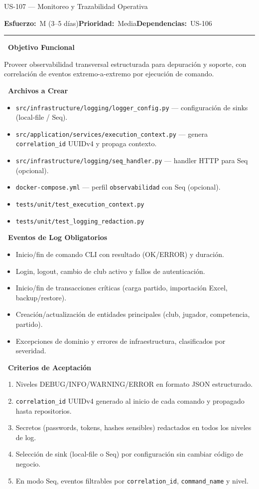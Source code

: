 \documentclass[11pt,a4paper]{article}
\newcommand{\fpath}[1]{\texttt{\small #1}}
\newcommand{\usfield}[2][\;]{%
  \par\vspace{5pt}%
  {\small\textbf{\textcolor{primary}{#2}}}\par\vspace{2pt}%
}
\newcommand{\usmeta}[3]{%
  \vspace{2pt}%
  {\small\textcolor{secondary}{%
    \textbf{Esfuerzo:}~#1\quad\textbf{Prioridad:}~#2\quad\textbf{Dependencias:}~#3%
  }}%
  \par\vspace{4pt}%
  \textcolor{bordergray}{\rule{\linewidth}{0.4pt}}\par\vspace{4pt}%
}
\begin{document}
\begin{uscard}{US-107 — Monitoreo y Trazabilidad Operativa}

\usmeta{M (3–5 días)}{Media}{US-106}

\usfield{\faAlignLeft\ Objetivo Funcional}
Proveer observabilidad transversal estructurada para depuración y soporte, con correlación de eventos extremo-a-extremo por ejecución de comando.

\usfield{\faFolderOpen\ Archivos a Crear}
\begin{itemize}[nosep, leftmargin=1.6em]
  \item \fpath{src/infrastructure/logging/logger\_config.py} — configuración de sinks (local-file / Seq).
  \item \fpath{src/application/services/execution\_context.py} — genera \fpath{correlation\_id} UUIDv4 y propaga contexto.
  \item \fpath{src/infrastructure/logging/seq\_handler.py} — handler HTTP para Seq (opcional).
  \item \fpath{docker-compose.yml} — perfil \fpath{observabilidad} con Seq (opcional).
  \item \fpath{tests/unit/test\_execution\_context.py}
  \item \fpath{tests/unit/test\_logging\_redaction.py}
\end{itemize}

\usfield{\faBell\ Eventos de Log Obligatorios}
\begin{itemize}[nosep, leftmargin=1.6em]
  \item Inicio/fin de comando CLI con resultado (OK/ERROR) y duración.
  \item Login, logout, cambio de club activo y fallos de autenticación.
  \item Inicio/fin de transacciones críticas (carga partido, importación Excel, backup/restore).
  \item Creación/actualización de entidades principales (club, jugador, competencia, partido).
  \item Excepciones de dominio y errores de infraestructura, clasificados por severidad.
\end{itemize}

\usfield{\faCheckCircle\ Criterios de Aceptación}
\begin{enumerate}[label=\textcolor{accent}{\textbf{AC\arabic*.}}, nosep, leftmargin=2.2em]
  \item Niveles DEBUG/INFO/WARNING/ERROR en formato JSON estructurado.
  \item \fpath{correlation\_id} UUIDv4 generado al inicio de cada comando y propagado hasta repositorios.
  \item Secretos (passwords, tokens, hashes sensibles) redactados en todos los niveles de log.
  \item Selección de sink (local-file o Seq) por configuración sin cambiar código de negocio.
  \item En modo Seq, eventos filtrables por \fpath{correlation\_id}, \fpath{command\_name} y nivel.
\end{enumerate}


\end{uscard}
\end{document}
